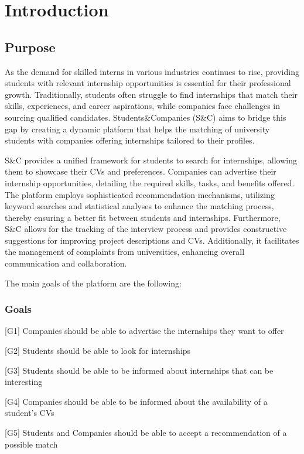 \chapter{Introduction}

\section{Purpose}
As the demand for skilled interns in various industries continues to rise, providing students with relevant internship opportunities is essential for their professional growth. 
Traditionally, students often struggle to find internships that match their skills, experiences, and career aspirations, while companies face challenges in sourcing qualified candidates. 
Students\&Companies (S\&C) aims to bridge this gap by creating a dynamic platform that helps the matching of university students with companies offering internships tailored to their profiles.

S\&C provides a unified framework for students to search for internships, allowing them to showcase their CVs and preferences. 
Companies can advertise their internship opportunities, detailing the required skills, tasks, and benefits offered.
The platform employs sophisticated recommendation mechanisms, utilizing keyword searches and statistical analyses to enhance the matching process, thereby ensuring a better fit between students and internships.
Furthermore, S\&C allows for the tracking of the interview process and provides constructive suggestions for improving project descriptions and CVs. Additionally, it facilitates the management of complaints from universities, enhancing overall communication and collaboration. 

The main goals of the platform are the following:

\subsection{Goals}

[G1] Companies should be able to advertise the internships they want to offer 

[G2] Students should be able to look for internships 

[G3] Students should be able to be informed about internships that can be interesting  

[G4] Companies should be able to be informed about the availability of a student's CVs 

[G5] Students and Companies should be able to accept a recommendation of a possible match

